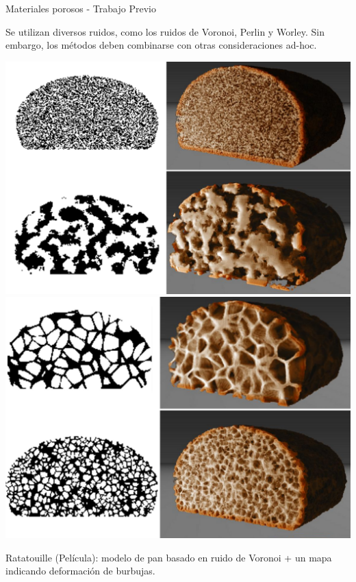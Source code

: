\documentclass[spanish,unknownkeysallowed]{beamer}
\begin{document}
\begin{frame}{Materiales porosos - Trabajo Previo}

Se utilizan diversos ruidos, como los ruidos de Voronoi, Perlin y Worley. Sin embargo, los métodos deben combinarse con otras consideraciones ad-hoc.

\includegraphics[scale = 0.2]{../figures/Fig8}
\includegraphics[scale = 0.2]{../figures/Fig9CAVW}

Ratatouille (Película): modelo de pan basado en ruido de Voronoi + un mapa indicando deformación de burbujas.
\end{frame}
\end{document}
